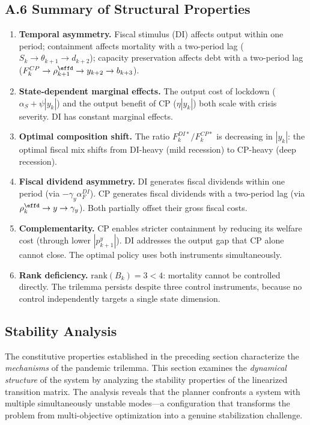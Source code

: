 \documentclass[12pt, a4paper]{article}
\begin{document}
\subsection*{A.6 Summary of Structural Properties}

\begin{enumerate}
    \item \textbf{Temporal asymmetry.} Fiscal stimulus (DI) affects output within one period; containment affects mortality with a two-period lag ($S_k \to \theta_{k+1} \to d_{k+2}$); capacity preservation affects debt with a two-period lag ($F_k^{CP} \to \rho_{k+1}^{\effd} \to y_{k+2} \to b_{k+3}$).

    \item \textbf{State-dependent marginal effects.} The output cost of lockdown ($\alpha_S + \psi|y_k|$) and the output benefit of CP ($\eta|y_k|$) both scale with crisis severity. DI has constant marginal effects.

    \item \textbf{Optimal composition shift.} The ratio $F_k^{DI*} / F_k^{CP*}$ is decreasing in $|y_k|$: the optimal fiscal mix shifts from DI-heavy (mild recession) to CP-heavy (deep recession).

    \item \textbf{Fiscal dividend asymmetry.} DI generates fiscal dividends within one period (via $-\gamma_y \alpha_F^{DI}$). CP generates fiscal dividends with a two-period lag (via $\rho_k^{\effd} \to y \to \gamma_y$). Both partially offset their gross fiscal costs.

    \item \textbf{Complementarity.} CP enables stricter containment by reducing its welfare cost (through lower $|p_{k+1}^y|$). DI addresses the output gap that CP alone cannot close. The optimal policy uses both instruments simultaneously.

    \item \textbf{Rank deficiency.} $\text{rank}(B_k) = 3 < 4$: mortality cannot be controlled directly. The trilemma persists despite three control instruments, because no control independently targets a single state dimension.
\end{enumerate}

\subsection{Stability Analysis}
\label{sec:stability}

The constitutive properties established in the preceding section characterize the
\textit{mechanisms} of the pandemic trilemma. This section examines the
\textit{dynamical structure} of the system by analyzing the stability properties of
the linearized transition matrix. The analysis reveals that the planner confronts a
system with multiple simultaneously unstable modes---a configuration that transforms
the problem from multi-objective optimization into a genuine stabilization challenge.
\end{document}

